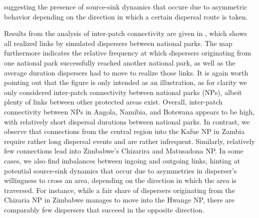 \documentclass[abstract=on,10pt,a4paper,bibliography=totocnumbered]{article}
\begin{document}
 suggesting the presence of source-sink dynamics that occure due to asymmetric behavior depending on the direction in which a certain dispersal route is taken.


Results from the analysis of inter-patch connectivity are given in
, which shows all realized links by simulated
dispersers between national parks. The map furthermore indicates the relative
frequency at which dispersers originating from one national park successfully
reached another national park, as well as the average duration dispersers had to
move to realize those links. It is again worth pointing out that the figure is
only intended as an illustration, as for clarity we only considered inter-patch
connectivity between national parks (NPs), albeit plenty of links between other
protected areas exist. Overall, inter-patch connectivity between NPs in Angola,
Namibia, and Botswana appears to be high, with relatively short dispersal
durations between national parks. In contrast, we observe that connections from
the central region into the Kafue NP in Zambia require rather long dispersal
events and are rather infrequent. Similarly, relatively few connections lead
into Zimbabwe's Chizarira and Matusadona NP. In some cases, we also find
imbalances between ingoing and outgoing links, hinting at potential source-sink
dynamics that occur due to asymmetries in disperser's willingness to cross an
area, depending on the direction in which the area is traversed. For instance,
while a fair share of dispersers originating from the Chizaria NP in Zimbabwe
manages to move into the Hwange NP, there are comparably few dispersers that
succeed in the opposite direction.

\end{document}
